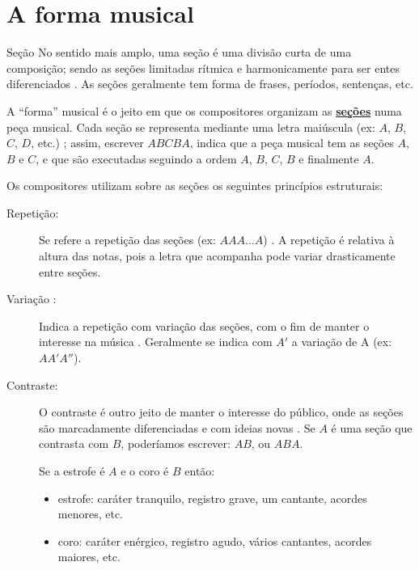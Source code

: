 


\section{A forma musical}
\label{sec:FormaMusical}

\begin{tcbinformation}{Seção}
\label{ref:Secao}
No sentido mais amplo, uma seção é uma divisão curta de uma composição;
sendo as seções limitadas rítmica e harmonicamente para ser entes diferenciados \cite[pp. 174]{baker1895dictionary}.
As seções geralmente tem forma de frases, períodos, sentenças, etc. 
\end{tcbinformation} 

A ``forma'' musical é o jeito em que os compositores organizam as \hyperref[ref:Secao]{\textbf{seções}} numa peça musical.
Cada seção se representa mediante uma letra maiúscula (ex: $A$, $B$, $C$, $D$, etc.) \cite[pp. 71]{bennett1993elementos};
assim, escrever $ABCBA$, indica que a peça musical tem as seções $A$, $B$ e $C$,
e que são executadas seguindo a ordem $A$, $B$, $C$, $B$ e finalmente $A$.


Os compositores utilizam sobre as seções os seguintes princípios estruturais:
\begin{description}
\item[Repetição:] Se refere a repetição das seções (ex: $AAA...A$) 
\cite[pp. 71]{bennett1993elementos} \cite[pp. 88]{howard1991aprendendo} \cite[pp. 53]{colluraimprovisacao} 
\cite[pp. 85]{holland2013music}.
A repetição é relativa à altura das notas, 
pois a letra que acompanha pode variar drasticamente entre seções.
 
\item[Variação :] Indica a repetição com variação das seções, 
 com o fim de manter o interesse na música
\cite[pp. 71]{bennett1993elementos} \cite[pp. 88]{howard1991aprendendo} \cite[pp. 53]{colluraimprovisacao}.
Geralmente se indica com $A'$ a variação de A (ex: $AA'A''$).

\item[Contraste:] O contraste é outro jeito de manter o interesse do 
público, onde as seções são  marcadamente diferenciadas e com ideias novas
\cite[pp. 71]{bennett1993elementos} \cite[pp. 88]{howard1991aprendendo} 
\cite[pp. 53]{colluraimprovisacao}  \cite[pp. 85]{holland2013music}.
Se $A$ é uma seção que contrasta com $B$, poderíamos escrever: $AB$, ou $ABA$.
\begin{example}
Se a estrofe é $A$ e o coro é $B$ então:
\begin{itemize} 
\item estrofe: caráter tranquilo, registro grave, um cantante, acordes menores, etc.
\item coro: caráter enérgico, registro agudo, vários cantantes, acordes maiores, etc.
\end{itemize}
\end{example}
\end{description} 

